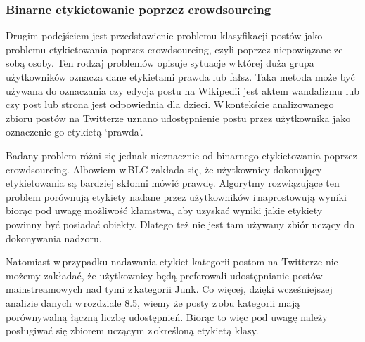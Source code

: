 \subsubsection{Binarne etykietowanie poprzez crowdsourcing}
Drugim podejściem jest przedstawienie problemu klasyfikacji postów jako problemu etykietowania poprzez crowdsourcing, czyli poprzez niepowiązane ze sobą osoby. Ten rodzaj problemów opisuje sytuacje w\,której duża grupa użytkowników oznacza dane etykietami prawda lub fałsz. Taka metoda może być używana do oznaczania czy edycja postu na Wikipedii jest aktem wandalizmu lub czy post lub strona jest odpowiednia dla dzieci\cite{de2015reliable}. W\,kontekście analizowanego zbioru postów na Twitterze uznano udostępnienie postu przez użytkownika jako oznaczenie go etykietą ‘prawda’.
\par
Badany problem różni się jednak nieznacznie od binarnego etykietowania poprzez crowdsourcing. Albowiem w\,BLC zakłada się, że użytkownicy dokonujący etykietowania są bardziej skłonni mówić prawdę. Algorytmy rozwiązujące ten problem porównują etykiety nadane przez użytkowników i\,naprostowują wyniki biorąc pod uwagę możliwość kłamstwa, aby uzyskać wyniki jakie etykiety powinny być posiadać obiekty.  Dlatego też nie jest tam używany zbiór uczący do dokonywania nadzoru.
\par
Natomiast w\,przypadku nadawania etykiet kategorii postom na Twitterze nie możemy zakładać, że użytkownicy będą preferowali udostępnianie postów mainstreamowych nad tymi z\,kategorii Junk. Co więcej, dzięki wcześniejszej analizie danych w\,rozdziale 8.5, wiemy że posty z\,obu kategorii mają porównywalną łączną liczbę udostępnień. Biorąc to więc pod uwagę należy posługiwać się zbiorem uczącym z\,określoną etykietą klasy.

